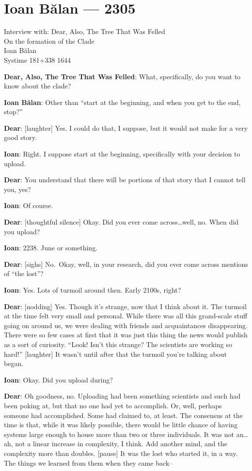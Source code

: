 \hypertarget{ioan-bux103lan-2305}{%
\chapter*{Ioan Bălan — 2305}\label{ioan-bux103lan-2305}}

Interview with: Dear, Also, The Tree That Was Felled\\
On the formation of the Clade\\
Ioan Bălan\\
Systime 181+338 1644

\textbf{Dear, Also, The Tree That Was Felled}: What, specifically, do you want to know about the clade?

\textbf{Ioan Bălan}: Other than ``start at the beginning, and when you get to the end, stop?''

\textbf{Dear}: {[}laughter{]} Yes. I could do that, I suppose, but it would not make for a very good story.

\textbf{Ioan}: Right. I suppose start at the beginning, specifically with your decision to upload.

\textbf{Dear}: You understand that there will be portions of that story that I cannot tell you, yes?

\textbf{Ioan}: Of course.

\textbf{Dear}: {[}thoughtful silence{]} Okay. Did you ever come across\ldots{}well, no. When did you upload?

\textbf{Ioan}: 2238. June or something.

\textbf{Dear}: {[}sighs{]} No.~Okay, well, in your research, did you ever come across mentions of ``the lost''?

\textbf{Ioan}: Yes. Lots of turmoil around then. Early 2100s, right?

\textbf{Dear}: {[}nodding{]} Yes. Though it's strange, now that I think about it. The turmoil at the time felt very small and personal. While there was all this grand-scale stuff going on around us, we were dealing with friends and acquaintances disappearing. There were so few cases at first that it was just this thing the news would publish as a sort of curiosity. ``Look! Isn't this strange? The scientists are working so hard!'' {[}laughter{]} It wasn't until after that the turmoil you're talking about began.

\textbf{Ioan}: Okay. Did you upload during?

\textbf{Dear}: Oh goodness, no. Uploading had been something scientists and such had been poking at, but that no one had yet to accomplish. Or, well, perhaps someone had accomplished. Some had claimed to, at least. The consensus at the time is that, while it was likely possible, there would be little chance of having systems large enough to house more than two or three individuals. It was not an\ldots{}ah, not a linear increase in complexity, I think. Add another mind, and the complexity more than doubles. {[}pause{]} It was the lost who started it, in a way. The things we learned from them when they came back--

